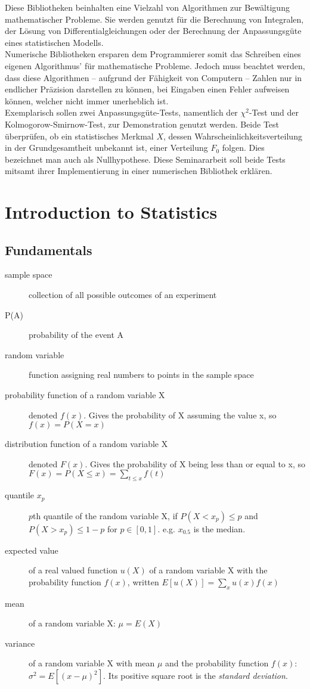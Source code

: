\documentclass{article}
\begin{document}
Diese Bibliotheken beinhalten eine Vielzahl von Algorithmen zur Bewältigung mathematischer Probleme. Sie werden genutzt für die Berechnung von Integralen, der Lösung von Differentialgleichungen oder der Berechnung der Anpassungsgüte eines statistischen Modells.\\
Numerische Bibliotheken ersparen dem Programmierer somit das Schreiben eines eigenen Algorithmus' für mathematische Probleme. Jedoch muss beachtet werden, dass diese Algorithmen -- aufgrund der Fähigkeit von Computern -- Zahlen nur in endlicher Präzision darstellen zu können, bei Eingaben einen Fehler aufweisen können, welcher nicht immer unerheblich ist.\\
Exemplarisch sollen zwei Anpassungsgüte-Tests, namentlich der $\chi^2$-Test und der Kolmogorow-Smirnow-Test, zur Demonstration genutzt werden.
Beide Test überprüfen, ob ein statistisches Merkmal $X$, dessen Wahrscheinlichkeitsverteilung in der Grundgesamtheit unbekannt ist, einer Verteilung $F_0$ folgen. Dies bezeichnet man auch als Nullhypothese.
Diese Seminararbeit soll beide Tests mitsamt ihrer Implementierung in einer numerischen Bibliothek erklären.


\section{Introduction to Statistics}
\subsection{Fundamentals}
\begin{description}
	\item[sample space] collection of all possible outcomes of an experiment
	\item[P(A)] probability of the event A
	\item[random variable] function assigning real numbers to points in the sample space
	\item[probability function of a random variable X] denoted $f(x)$. Gives the probability of X assuming the value x, so $f(x) = P(X = x)$
	\item[distribution function of a random variable X] denoted $F(x)$. Gives the probability of X being less than or equal to x, so $F(x) = P(X \leq x) = \sum_{t\leq x}f(t)$
	\item[quantile $x_p$] $p$th quantile of the random variable X, if $P(X<x_p)\leq p$ and $P(X>x_p)\leq 1-p$ for $p\in[0,1]$. e.g. $x_{0.5}$ is the median.
	\item[expected value] of a real valued function $u(X)$ of a random variable X with the probability function $f(x)$, written $E[u(X)] = \sum_{x}u(x)f(x)$
	\item[mean] of a random variable X: $\mu = E(X)$
	\item[variance] of a random variable X with mean $\mu$ and the probability function $f(x)$: $\sigma^2 = E[(x-\mu)^2]$. Its positive square root is the \emph{standard deviation}.

\end{description}
\end{document}
